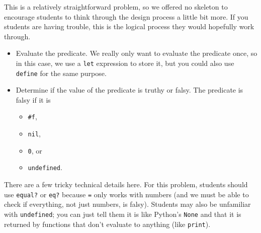 \begin{questionmeta}
This is a relatively straightforward problem, so we offered no skeleton to encourage students to think through the design process a little bit more. If you students are having trouble, this is the logical process they would hopefully work through. 

\begin{itemize}
\item Evaluate the predicate. We really only want to evaluate the predicate once, so in this case, we use a \lstinline{let} expression to store it, but you could also use \lstinline{define} for the same purpose. 
\item Determine if the value of the predicate is truthy or falsy. The predicate is falsy if it is 
\begin{itemize}
    \item \lstinline{#f},
    \item \lstinline{nil},
    \item \lstinline{0}, or
    \item \lstinline{undefined}.
\end{itemize}
\end{itemize}

There are a few tricky technical details here. For this problem, students should use \lstinline{equal?} or \lstinline{eq?} because \lstinline{=} only works with numbers (and we must be able to check if everything, not just numbers, is falsy). Students may also be unfamiliar with \lstinline{undefined}; you can just tell them it is like Python's \lstinline{None} and that it is returned by functions that don't evaluate to anything (like \lstinline{print}).  
\end{questionmeta}